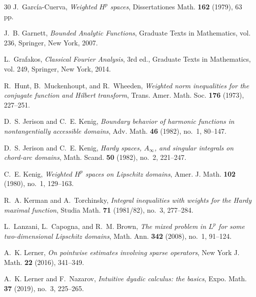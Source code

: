 \documentclass[12pt]{amsart}
\theoremstyle{plain}
\theoremstyle{definition}
\numberwithin{equation}{section}
\begin{document}
\begin{thebibliography}{30}
J.~García-Cuerva,
\textit{Weighted \(H^p\) spaces},
Dissertationes Math. \textbf{162} (1979), 63 pp.



J.~B. Garnett,
\textit{Bounded Analytic Functions},
Graduate Texts in Mathematics, vol. 236, Springer, New York, 2007.



L.~Grafakos,
\textit{Classical Fourier Analysis}, 3rd ed.,
Graduate Texts in Mathematics, vol. 249, Springer, New York, 2014.






R.~Hunt, B.~Muckenhoupt, and R.~Wheeden,
\textit{Weighted norm inequalities for the conjugate function and Hilbert transform},
Trans. Amer. Math. Soc. \textbf{176} (1973), 227--251.




D.~S. Jerison and C.~E. Kenig,
\textit{Boundary behavior of harmonic functions in nontangentially accessible domains},
Adv. Math. \textbf{46} (1982), no.~1, 80--147.


D.~S. Jerison and C.~E. Kenig,
\textit{Hardy spaces, \(A_\infty\), and singular integrals on chord-arc domains},
Math. Scand. \textbf{50} (1982), no.~2, 221--247.




C.~E. Kenig,
\textit{Weighted \(H^p\) spaces on Lipschitz domains},
Amer. J. Math. \textbf{102} (1980), no.~1, 129--163.



R.~A. Kerman and A.~Torchinsky,
\textit{Integral inequalities with weights for the Hardy maximal function},
Studia Math. \textbf{71} (1981/82), no.~3, 277--284.



L.~Lanzani, L.~Capogna, and R.~M. Brown,
\textit{The mixed problem in {$L^p$} for some two-dimensional Lipschitz domains},
Math. Ann. \textbf{342} (2008), no.~1, 91--124.


A.~K. Lerner,
\textit{On pointwise estimates involving sparse operators},
New York J. Math. \textbf{22} (2016), 341--349.

A.~K. Lerner and F.~Nazarov,
\textit{Intuitive dyadic calculus: the basics},
Expo. Math. \textbf{37} (2019), no.~3, 225--265.



\end{thebibliography}
\end{document}

